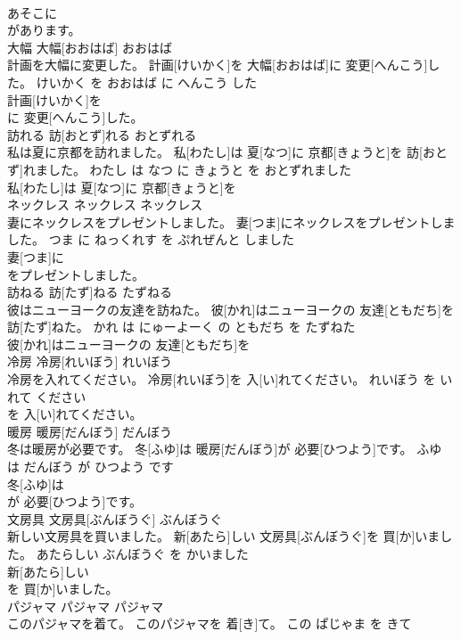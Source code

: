 \documentclass[8pt]{extreport}
\begin{document}
\begin{CJK}{UTF8}{min}
\\	あそこに
\\	があります。		
\\	大幅	大幅[おおはば]	おおはば	
\\	計画を大幅に変更した。	計画[けいかく]を 大幅[おおはば]に 変更[へんこう]した。	けいかく を おおはば に へんこう した	
\\	計画[けいかく]を
\\	に 変更[へんこう]した。		
\\	訪れる	訪[おとず]れる	おとずれる	
\\	私は夏に京都を訪れました。	私[わたし]は 夏[なつ]に 京都[きょうと]を 訪[おとず]れました。	わたし は なつ に きょうと を おとずれました	
\\	私[わたし]は 夏[なつ]に 京都[きょうと]を
\\	ネックレス	ネックレス	ネックレス	
\\	妻にネックレスをプレゼントしました。	妻[つま]にネックレスをプレゼントしました。	つま に ねっくれす を ぷれぜんと しました	
\\	妻[つま]に
\\	をプレゼントしました。		
\\	訪ねる	訪[たず]ねる	たずねる	
\\	彼はニューヨークの友達を訪ねた。	彼[かれ]はニューヨークの 友達[ともだち]を 訪[たず]ねた。	かれ は にゅーよーく の ともだち を たずねた	
\\	彼[かれ]はニューヨークの 友達[ともだち]を
\\	冷房	冷房[れいぼう]	れいぼう	
\\	冷房を入れてください。	冷房[れいぼう]を 入[い]れてください。	れいぼう を いれて ください	
\\	を 入[い]れてください。		
\\	暖房	暖房[だんぼう]	だんぼう	
\\	冬は暖房が必要です。	冬[ふゆ]は 暖房[だんぼう]が 必要[ひつよう]です。	ふゆ は だんぼう が ひつよう です	
\\	冬[ふゆ]は
\\	が 必要[ひつよう]です。		
\\	文房具	文房具[ぶんぼうぐ]	ぶんぼうぐ	
\\	新しい文房具を買いました。	新[あたら]しい 文房具[ぶんぼうぐ]を 買[か]いました。	あたらしい ぶんぼうぐ を かいました	
\\	新[あたら]しい
\\	を 買[か]いました。		
\\	パジャマ	パジャマ	パジャマ	
\\	このパジャマを着て。	このパジャマを 着[き]て。	この ぱじゃま を きて	

\end{CJK}
\end{document}
